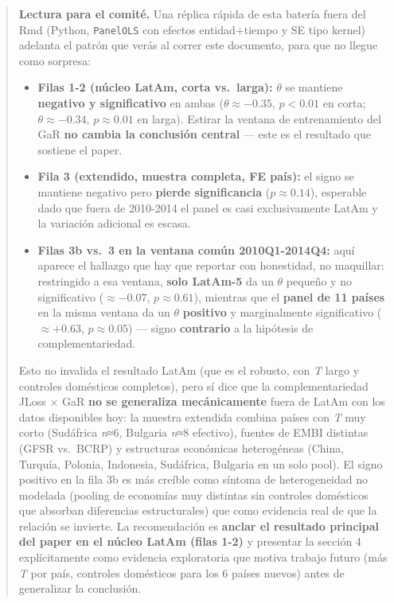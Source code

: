 \documentclass[
]{article}
\providecommand{\tightlist}{%
  \setlength{\itemsep}{0pt}\setlength{\parskip}{0pt}}
\begin{document}
\begin{quote}
\textbf{Lectura para el comité.} Una réplica rápida de esta batería
fuera del Rmd (Python, \texttt{PanelOLS} con efectos entidad+tiempo y SE
tipo kernel) adelanta el patrón que verás al correr este documento, para
que no llegue como sorpresa:

\begin{itemize}
\tightlist
\item
  \textbf{Filas 1-2 (núcleo LatAm, corta vs.~larga):} \(\theta\) se
  mantiene \textbf{negativo y significativo} en ambas
  (\(\theta\approx-0.35\), \(p<0.01\) en corta; \(\theta\approx-0.34\),
  \(p\approx0.01\) en larga). Estirar la ventana de entrenamiento del
  GaR \textbf{no cambia la conclusión central} --- este es el resultado
  que sostiene el paper.
\item
  \textbf{Fila 3 (extendido, muestra completa, FE país):} el signo se
  mantiene negativo pero \textbf{pierde significancia}
  (\(p\approx0.14\)), esperable dado que fuera de 2010-2014 el panel es
  casi exclusivamente LatAm y la variación adicional es escasa.
\item
  \textbf{Filas 3b vs.~3 en la ventana común 2010Q1-2014Q4:} aquí
  aparece el hallazgo que hay que reportar con honestidad, no maquillar:
  restringido a esa ventana, \textbf{solo LatAm-5} da un \(\theta\)
  pequeño y no significativo (\(\approx-0.07\), \(p\approx0.61\)),
  mientras que el \textbf{panel de 11 países} en la misma ventana da un
  \(\theta\) \textbf{positivo} y marginalmente significativo
  (\(\approx+0.63\), \(p\approx0.05\)) --- signo \textbf{contrario} a la
  hipótesis de complementariedad.
\end{itemize}

Esto no invalida el resultado LatAm (que es el robusto, con \emph{T}
largo y controles domésticos completos), pero sí dice que la
complementariedad JLoss × GaR \textbf{no se generaliza mecánicamente}
fuera de LatAm con los datos disponibles hoy: la muestra extendida
combina países con \emph{T} muy corto (Sudáfrica \emph{n}≈6, Bulgaria
\emph{n}≈8 efectivo), fuentes de EMBI distintas (GFSR vs.~BCRP) y
estructuras económicas heterogéneas (China, Turquía, Polonia, Indonesia,
Sudáfrica, Bulgaria en un solo pool). El signo positivo en la fila 3b es
más creíble como síntoma de heterogeneidad no modelada (pooling de
economías muy distintas sin controles domésticos que absorban
diferencias estructurales) que como evidencia real de que la relación se
invierte. La recomendación es \textbf{anclar el resultado principal del
paper en el núcleo LatAm (filas 1-2)} y presentar la sección 4
explícitamente como evidencia exploratoria que motiva trabajo futuro
(más \emph{T} por país, controles domésticos para los 6 países nuevos)
antes de generalizar la conclusión.
\end{quote}
\end{document}
